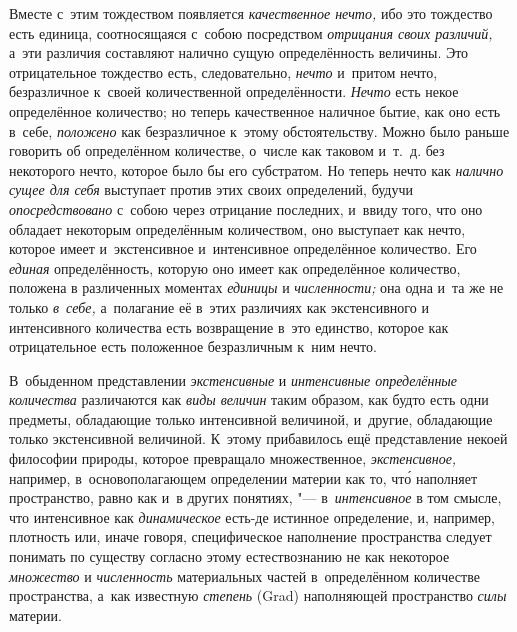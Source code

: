 Вместе с~этим тождеством появляется {\em качественное нечто,} ибо это тождество
есть единица, соотносящаяся с~собою посредством {\em отрицания своих различий,}
а~эти различия составляют налично сущую определённость величины. Это
отрицательное тождество есть, следовательно, {\em нечто} и~притом нечто,
безразличное к~своей количественной определённости. {\em Нечто} есть некое
определённое количество; но теперь качественное наличное бытие, как оно есть
в~себе, {\em положено} как безразличное к~этому обстоятельству. Можно было
раньше говорить об определённом количестве, о~числе как таковом и~т.~д. без
некоторого нечто, которое было бы его субстратом. Но теперь нечто как
{\em налично сущее для себя} выступает против этих своих определений, будучи
{\em опосредствовано} с~собою через отрицание последних, и~ввиду того, что оно
обладает некоторым определённым количеством, оно выступает как нечто, которое
имеет и~экстенсивное и~интенсивное определённое количество. Его {\em единая}
определённость, которую оно имеет как определённое количество, положена в
различенных моментах {\em единицы} и {\em численности;} она одна и~та же не
только {\em в~себе,} а~полагание её в~этих различиях как экстенсивного и
интенсивного количества есть возвращение в~это единство, которое как
отрицательное есть положенное безразличным к~ним нечто.


В~обыденном представлении {\em экстенсивные} и {\em интенсивные определённые
количества} различаются как {\em виды величин} таким образом, как будто есть
одни предметы, обладающие только интенсивной величиной, и~другие, обладающие
только экстенсивной величиной. К~этому прибавилось ещё представление
некоей философии природы, которое превращало множественное,
{\em экстенсивное,} например, в~основополагающем определении материи как то, чт\'{о} наполняет
пространство, равно как и~в других понятиях, "--- в~{\em интенсивное} в
том смысле, что интенсивное как {\em динамическое} есть-де истинное определение,
и, например, плотность или, иначе говоря, специфическое наполнение пространства
следует понимать по существу согласно этому естествознанию не как некоторое
{\em множество} и {\em численность} материальных частей в~определённом
количестве пространства, а~как известную {\em степень} (Grad) наполняющей
пространство {\em силы} материи.


